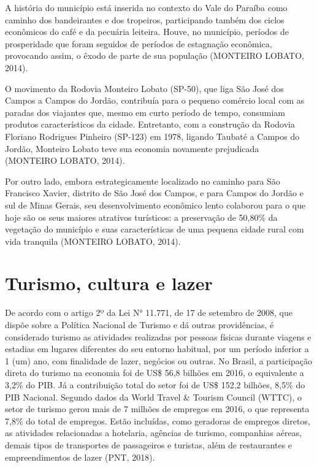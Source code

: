 A história do município está inserida no contexto do Vale do Paraíba como caminho dos bandeirantes e dos tropeiros, participando também dos ciclos econômicos do café e da pecuária leiteira. Houve, no município, períodos de prosperidade que foram seguidos de períodos de estagnação econômica, provocando assim, o êxodo de parte de sua população (MONTEIRO LOBATO, 2014).

O movimento da Rodovia Monteiro Lobato (SP-50), que liga São José dos Campos a Campos do Jordão, contribuía para o pequeno comércio local com as paradas dos viajantes que, mesmo em curto período de tempo, consumiam produtos característicos da cidade. Entretanto, com a construção da Rodovia Floriano Rodrigues Pinheiro (SP-123) em 1978, ligando Taubaté a Campos do Jordão, Monteiro Lobato teve sua economia novamente prejudicada (MONTEIRO LOBATO, 2014).

Por outro lado, embora estrategicamente localizado no caminho para São Francisco Xavier, distrito de São José dos Campos, e para Campos do Jordão e sul de Minas Gerais, seu desenvolvimento econômico lento colaborou para o que hoje são os seus maiores atrativos turísticos: a preservação de 50,80\% da vegetação do município e suas características de uma pequena cidade rural com vida tranquila (MONTEIRO LOBATO, 2014).

\section{Turismo, cultura e lazer}

De acordo com o artigo 2º da Lei N° 11.771, de 17 de setembro de 2008, que dispõe sobre a Política Nacional de Turismo e dá outras providências, é considerado turismo as atividades realizadas por pessoas físicas durante viagens e estadias em lugares diferentes do seu entorno habitual, por um período inferior a 1 (um) ano, com finalidade de lazer, negócios ou outras.
No Brasil, a participação direta do turismo na economia foi de US\$ 56,8 bilhões em 2016, o equivalente a 3,2\% do PIB. Já a contribuição total do setor foi de US\$ 152,2 bilhões, 8,5\% do PIB Nacional. Segundo dados da World Travel \& Tourism Council (WTTC), o setor de turismo gerou mais de 7 milhões de empregos em 2016, o que representa 7,8\% do total de empregos. Estão incluídas, como geradoras de empregos diretos, as atividades relacionadas a hotelaria, agências de turismo, companhias aéreas, demais tipos de transportes de passageiros e turistas, além de restaurantes e empreendimentos de lazer (PNT, 2018).

